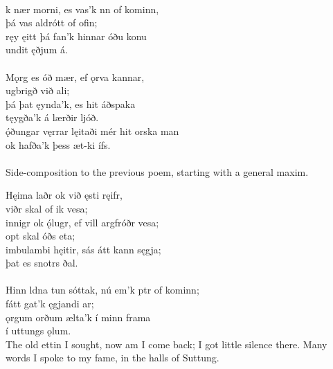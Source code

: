  \\

\bva {}k nær morni, \hld es vas'k nn of kominn, \\%
\ind þá vas aldrótt of ofin; \\%
ręy ęitt þá fan'k \hld hinnar óðu konu \\%
\ind {}undit ęðjum á.\\%

 \\

\bva Mǫrg es óð mær, \hld ef ǫrva kannar, \\%
\ind {}ugbrigð við ali; \\%
þá þat ęynda'k, \hld es hit áðspaka \\%
\ind tęygða'k á lærðir ljóð. \\%
ǫ́ðungar vęrrar \hld lęitaði mér hit orska man \\%
\ind ok hafða'k þess æt-ki ífs.\\%

 \\

	Side-composition to the previous poem, starting with a general maxim.

\bva Hęima laðr \hld ok við ęsti ręifr, \\%
\ind {}viðr skal of ik vesa; \\%
innigr ok ǫ́lugr, \hld ef vill argfróðr vesa; \\%
\ind opt skal óðs eta; \\%
imbulambi hęitir, \hld sás átt kann sęgja; \\%
\ind þat es snotrs ðal.\\%

 \\

\bva Hinn ldna tun sóttak, \hld nú em'k ptr of kominn; \\%
\ind fátt gat'k ęgjandi ar; \\%
ǫrgum orðum \hld {}ælta'k í minn frama \\%
\ind í uttungs ǫlum.\\%

\bvb The old ettin I sought, now am I come back; I got little silence there. Many words I spoke to my fame, in the halls of Suttung. \\

